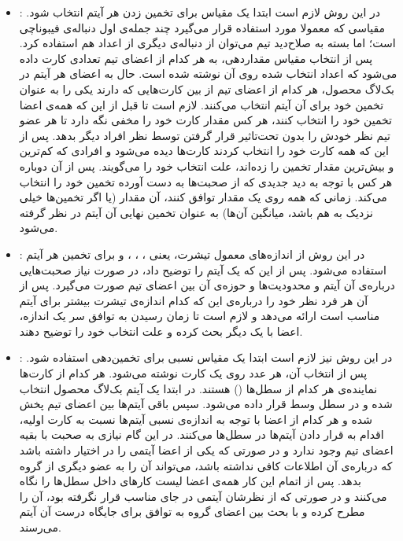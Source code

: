 {\begin{itemize}
\item
{}:
در این روش لازم است ابتدا یک مقیاس برای تخمین زدن هر آیتم انتخاب شود. مقیاسی که معمولا مورد استفاده قرار می‌گیرد چند جمله‌ی اول دنباله‌ی فیبوناچی است؛ اما بسته به صلاح‌دید تیم می‌توان از دنباله‌ی دیگری از اعداد هم استفاده کرد. پس از انتخاب مقیاس مقداردهی، به هر کدام از اعضای تیم تعدادی کارت داده می‌شود که اعداد انتخاب شده  روی آن نوشته شده است. حال به اعضای هر آیتم در بک‌لاگ محصول، هر کدام از اعضای تیم از بین کارت‌هایی که دارند یکی را به عنوان تخمین خود برای آن آیتم انتخاب می‌کنند. لازم است تا قبل از این که همه‌ی اعضا تخمین خود را انتخاب کنند، هر کس مقدار کارت خود را مخفی نگه دارد تا هر عضو تیم نظر خودش را بدون تحت‌تاثیر قرار گرفتن توسط نظر افراد دیگر بدهد. پس از این که همه کارت خود را انتخاب کردند کارت‌ها دیده می‌شود و افرادی که کم‌ترین و بیش‌ترین مقدار تخمین را زده‌اند، علت انتخاب خود را می‌گویند. پس از آن دوباره هر کس با توجه به دید جدیدی که از صحبت‌ها به دست آورده تخمین خود را انتخاب می‌کند. زمانی که همه روی یک مقدار توافق کنند، آن مقدار (یا اگر تخمین‌ها خیلی نزدیک به هم باشد، میانگین آن‌ها) به عنوان تخمین نهایی آن آیتم در نظر گرفته می‌شود.

\item
{}:
در این روش از اندازه‌های معمول تیشرت، یعنی
، ، ،  و 
برای تخمین
هر آیتم استفاده می‌شود. پس از این که  یک آیتم را توضیح داد، در صورت نیاز صحبت‌هایی درباره‌ی آن آیتم و محدودیت‌ها و حوزه‌ی  آن بین اعضای تیم صورت می‌گیرد. پس از آن هر فرد نظر خود را درباره‌ی این که کدام اندازه‌ی تیشرت بیشتر برای آیتم مناسب است ارائه می‌دهد و لازم است تا زمان رسیدن به توافق سر یک اندازه، اعضا با یک دیگر بحث کرده و علت انتخاب خود را توضیح دهند.

\item
{}:
در این روش نیز لازم است ابتدا یک مقیاس نسبی برای تخمین‌دهی استفاده شود. پس از انتخاب آن، هر عدد روی یک کارت نوشته می‌شود. هر کدام از کارت‌ها نماینده‌ی هر کدام از سطل‌ها () هستند. در ابتدا یک آیتم بک‌لاگ محصول انتخاب شده و در سطل وسط قرار داده می‌شود. سپس باقی آیتم‌ها بین اعضای تیم پخش شده و هر کدام از اعضا با توجه به اندازه‌ی نسبی آیتم‌ها نسبت به کارت اولیه، اقدام به قرار دادن آیتم‌ها در سطل‌ها می‌کنند. در این گام نیازی به صحبت با بقیه اعضای تیم وجود ندارد و در صورتی که یکی از اعضا آیتمی را در اختیار داشته باشد که درباره‌ی آن اطلاعات کافی نداشته باشد، می‌تواند آن را به عضو دیگری از گروه بدهد. پس از اتمام این کار همه‌ی اعضا لیست کارهای داخل سطل‌ها را نگاه می‌کنند و در صورتی که از نظرشان آیتمی در جای مناسب قرار نگرفته بود، آن را مطرح کرده و با بحث بین اعضای گروه به توافق برای جایگاه درست آن آیتم می‌رسند. 


\end{itemize}}

